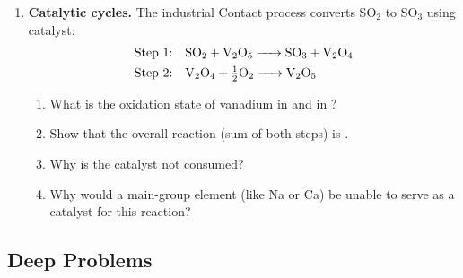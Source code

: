 \documentclass[12pt, a4paper]{book}
\begin{document}
\begin{problembox}
\begin{enumerate}[label=\textbf{\arabic*.}]
  \item \textbf{Catalytic cycles.}
        The industrial Contact process converts SO$_2$ to SO$_3$
        using  catalyst:
        \begin{align*}
          \text{Step 1:} & \quad
            \ce{SO2 + V2O5 -> SO3 + V2O4} \\
          \text{Step 2:} & \quad
            \ce{V2O4 + \tfrac{1}{2}O2 -> V2O5}
        \end{align*}
        \begin{enumerate}[label=(\alph*)]
          \item What is the oxidation state of vanadium in
                 and in ?
          \item Show that the overall reaction (sum of
                both steps) is .
          \item Why is the catalyst not consumed?
          \item Why would a main-group element (like Na or Ca)
                be unable to serve as a catalyst for this
                reaction?
        \end{enumerate}
\end{enumerate}
\end{problembox}

\subsection*{Deep Problems}
\end{document}
